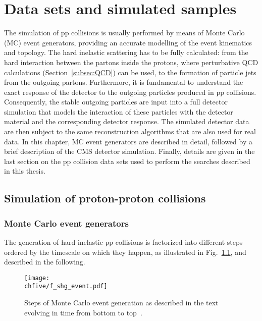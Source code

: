 \chapter{Data sets and simulated samples}
\label{ch:dataAndSim}

The simulation of pp collisions is usually performed by means of Monte Carlo (MC) event generators, providing an accurate modelling of the event kinematics and topology.
The hard inelastic scattering has to be fully calculated: from the hard interaction between the partons inside the protons, where perturbative QCD calculations (Section~\ref{subsec:QCD}) can be used, to the formation of particle jets from the outgoing partons.
Furthermore, it is fundamental to understand the exact response of the detector to the outgoing particles produced in pp collisions. 
Consequently, the stable outgoing particles are input into a full detector simulation that models the interaction of these particles with the detector material and the corresponding detector response.
The simulated detector data are then subject to the same reconstruction algorithms that are also used for real data.
In this chapter, MC event generators are described in detail, followed by a brief description of the CMS detector simulation.
Finally, details are given in the last section on the pp collision data sets used to perform the searches described in this thesis.

\section{Simulation of proton-proton collisions}

\subsection{Monte Carlo event generators}

The generation of hard inelastic pp collisions is factorized into different steps ordered by the timescale on which they happen, as illustrated in Fig.~\ref{fig:MCgenSteps}, and described in the following.\\

\begin{figure}[!htb]
\centering
\texttt{[image: \\chfive/f\_shg\_event.pdf]}
\caption{Steps of Monte Carlo event generation as described in the text evolving in time from bottom to top~\cite{Dobbs:2004qw}.}
\label{fig:MCgenSteps}
\end{figure}

